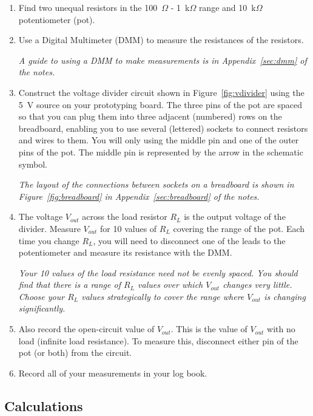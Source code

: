 \documentclass[11pt]{article}
\begin{document}
\begin{enumerate}
\item Find two unequal resistors in the 100~$\Omega$ - 1~k$\Omega$
  range and 10~k$\Omega$ potentiometer (pot).

\item Use a Digital Multimeter (DMM) to measure the resistances of the
  resistors.

  \emph{A guide to using a DMM to make measurements is in
    Appendix~\ref{sec:dmm} of the notes.}

\item Construct the voltage divider circuit shown in
  Figure~\ref{fig:vdivider} using the 5~V source on your prototyping
  board. The three pins of the pot are spaced so that you can plug
  them into three adjacent (numbered) rows on the breadboard, enabling
  you to use several (lettered) sockets to connect resistors and
  wires to them. You will only using the middle pin and one of the
  outer pins of the pot. The middle pin is represented by
  the arrow in the schematic symbol.

  \emph{The layout of the connections between sockets on a
  breadboard is shown in Figure~\ref{fig:breadboard} in
  Appendix~\ref{sec:breadboard} of the notes.}

\item The voltage $V_{out}$ across the load resistor $R_L$ is the
  output voltage of the divider. Measure $V_{out}$ for 10 values of
  $R_L$ covering the range of the pot. Each time you change $R_L$, you
  will need to disconnect one of the leads to the potentiometer and
  measure its resistance with the DMM.

  \emph{Your 10 values of the load resistance need not be evenly
    spaced. You should find that there is a range of $R_L$ values
    over which $V_{out}$ changes very little. Choose your $R_L$ values
    strategically to cover the range where $V_{out}$ is changing
    significantly.}

\item Also record the open-circuit value of $V_{out}$. This is the
  value of $V_{out}$ with no load (infinite load resistance). To
  measure this, disconnect either pin of the pot (or both) from the
  circuit.

\item Record all of your measurements in your log book.
\end{enumerate}

\subsection*{Calculations}
\end{document}
